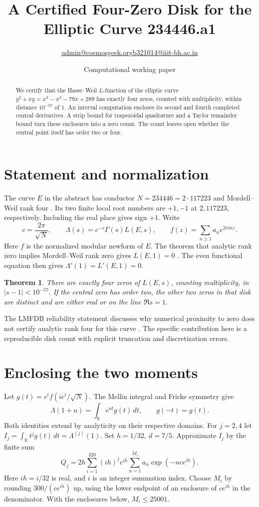 \documentclass[11pt]{article}
\title{A Certified Four-Zero Disk for the Elliptic Curve 234446.a1}
\author{\small \href{mailto:admin@cosmosgeek.org}{admin@cosmosgeek.org}\qquad \href{mailto:b321014@iiit-bh.ac.in}{b321014@iiit-bh.ac.in}}
\date{Computational working paper}
\newtheorem{theorem}{Theorem}
\newcommand{\R}{\mathbb R}
\begin{document}
\maketitle
\begin{abstract}
We certify that the Hasse--Weil \(L\)-function of the elliptic curve
\(y^2+xy=x^3-x^2-79x+289\) has exactly four zeros, counted with
multiplicity, within distance \(10^{-57}\) of \(1\).
An interval computation encloses its second and fourth completed
central derivatives. A strip bound for trapezoidal quadrature and a
Taylor remainder bound turn these enclosures into a zero count.
The count leaves open whether the central point itself has order two
or four.
\end{abstract}

\section{Statement and normalization}
The curve \(E\) in the abstract has conductor \(N=234446=2\cdot117223\)
and Mordell--Weil rank four \cite{curve}. Its two finite local root
numbers are \(+1,-1\) at \(2,117223\), respectively. Including the real
place gives sign \(+1\). Write
\[
 c=\frac{2\pi}{\sqrt N},\qquad
 \Lambda(s)=c^{-s}\Gamma(s)L(E,s),\qquad
 f(z)=\sum_{n\ge1}a_n e^{2\pi i n z}.
\]
Here \(f\) is the normalized modular newform of \(E\). The theorem
that analytic rank zero implies Mordell--Weil rank zero gives
\(L(E,1)=0\) \cite{Wiles}. The even functional equation then gives
\(\Lambda'(1)=L'(E,1)=0\).

\begin{theorem}
There are exactly four zeros of \(L(E,s)\), counting multiplicity,
in \(|s-1|<10^{-57}\). If the central zero has order two, the other
two zeros in that disk are distinct and are either real or on the
line \(\Re s=1\).
\end{theorem}
The LMFDB reliability statement discusses why numerical proximity to
zero does not certify analytic rank four for this curve \cite{reliability}.
The specific contribution here is a reproducible disk count with
explicit truncation and discretization errors.

\section{Enclosing the two moments}
Let \(g(t)=e^t f(ie^t/\sqrt N)\). The Mellin integral and Fricke
symmetry give
\[
 \Lambda(1+u)=\int_{\R}e^{ut}g(t)\,dt,\qquad g(-t)=g(t).
\]
Both identities extend by analyticity on their respective domains.
For \(j=2,4\) let \(I_j=\int_\R t^jg(t)\,dt=\Lambda^{(j)}(1)\).
Set \(h=1/32,\ d=7/5\). Approximate \(I_j\) by the finite sum
\[
 Q_j=2h\sum_{i=1}^{320}(ih)^j e^{ih}
       \sum_{n=1}^{M_i}a_n \exp(-nc e^{ih}).
\]
Here \(ih=i/32\) is real, and \(i\) is an integer summation index.
Choose \(M_i\) by rounding \(300/(ce^{ih})\) up, using the lower
endpoint of an enclosure of \(ce^{ih}\) in the denominator. With the
enclosures below, \(M_i\le25001\).
\end{document}
